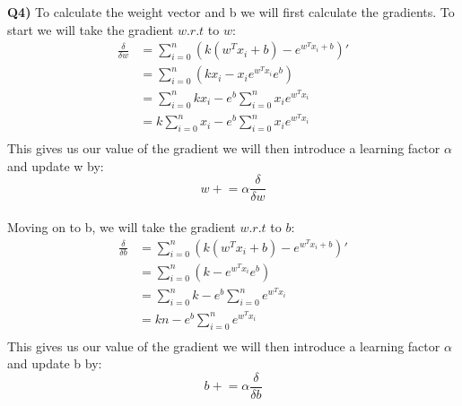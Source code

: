 \documentclass{article}
\begin{document}
\begin{titlepage}
\newpage

\textbf{Q4)} To calculate the weight vector and b we will first calculate the gradients. To start we will take the gradient $w.r.t$ to $w$:
\begin{align*}
\frac{\delta}{\delta w} &= \sum_{i=0}^{n} (k(w^Tx_i+b) - e^{w^Tx_i+b})' \\
&= \sum_{i=0}^{n} (kx_i - x_ie^{w^Tx_i}e^b) \\
&= \sum_{i=0}^{n} kx_i - e^b \sum_{i=0}^{n} x_ie^{w^Tx_i} \\
&= k\sum_{i=0}^{n} x_i - e^b \sum_{i=0}^{n} x_ie^{w^Tx_i} \\
\end{align*}
This gives us our value of the gradient we will then introduce a learning factor $\alpha$ and update w by:
\[ w \mathrel{+}= \alpha\frac{\delta}{\delta w} \]\\
Moving on to b, we will take the gradient  $w.r.t$ to $b$:
\begin{align*}
\frac{\delta}{\delta b} &= \sum_{i=0}^{n} (k(w^Tx_i+b) - e^{w^Tx_i+b})' \\
&= \sum_{i=0}^{n} (k - e^{w^Tx_i}e^b) \\
&= \sum_{i=0}^{n} k - e^b \sum_{i=0}^{n} e^{w^Tx_i} \\
&= kn - e^b \sum_{i=0}^{n} e^{w^Tx_i} \\
\end{align*}
This gives us our value of the gradient we will then introduce a learning factor $\alpha$ and update b by:
\[ b \mathrel{+}= \alpha\frac{\delta}{\delta b} \]

\end{titlepage}
\end{document}
